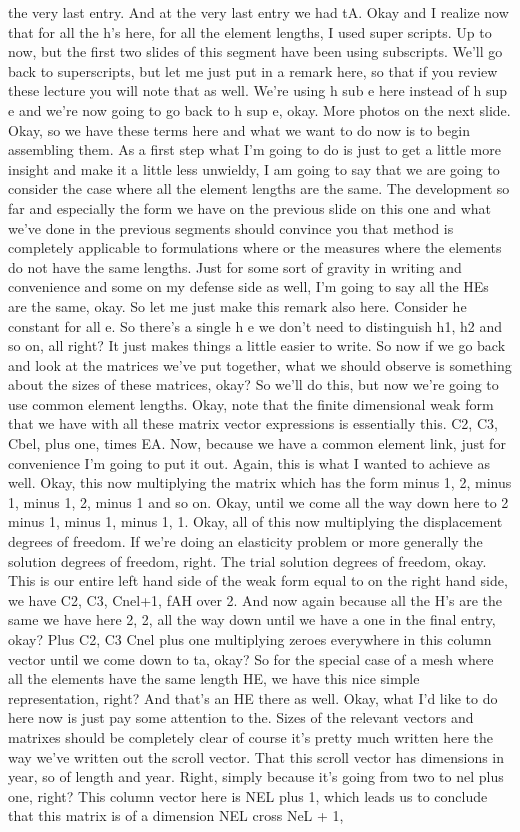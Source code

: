 \documentclass[10pt]{article}
\begin{document}
the very last entry. And at the very last entry we had tA. Okay and I realize now that for all the h's here, for all the element lengths, I used super scripts. Up to now, but the first two slides of this segment have been using subscripts. We'll go back to superscripts, but let me just put in a remark here, so that if you review these lecture you will note that as well. We're using h sub e here instead of h sup e and we're now going to go back to h sup e, okay. More photos on the next slide. Okay, so we have these terms here and what we want to do now is to begin assembling them. As a first step what I'm going to do is just to get a little more insight and make it a little less unwieldy, I am going to say that we are going to consider the case where all the element lengths are the same. The development so far and especially the form we have on the previous slide on this one and what we've done in the previous segments should convince you that method is completely applicable to formulations where or the measures where the elements do not have the same lengths. Just for some sort of gravity in writing and convenience and some on my defense side as well, I'm going to say all the HEs are the same, okay. So let me just make this remark also here. Consider he constant for all e. So there's a single h e we don't need to distinguish h1, h2 and so on, all right? It just makes things a little easier to write. So now if we go back and look at the matrices we've put together, what we should observe is something about the sizes of these matrices, okay? So we'll do this, but now we're going to use common element lengths. Okay, note that the finite dimensional weak form that we have with all these matrix vector expressions is essentially this. C2, C3, Cbel, plus one, times EA. Now, because we have a common element link, just for convenience I'm going to put it out. Again, this is what I wanted to achieve as well. Okay, this now multiplying the matrix which has the form minus 1, 2, minus 1, minus 1, 2, minus 1 and so on. Okay, until we come all the way down here to 2 minus 1, minus 1, minus 1, 1. Okay, all of this now multiplying the displacement degrees of freedom. If we're doing an elasticity problem or more generally the solution degrees of freedom, right. The trial solution degrees of freedom, okay. This is our entire left hand side of the weak form equal to on the right hand side, we have C2, C3, Cnel+1, fAH over 2. And now again because all the H's are the same we have here 2, 2, all the way down until we have a one in the final entry, okay? Plus C2, C3 Cnel plus one multiplying zeroes everywhere in this column vector until we come down to ta, okay? So for the special case of a mesh where all the elements have the same length HE, we have this nice simple representation, right? And that's an HE there as well. Okay, what I'd like to do here now is just pay some attention to the. Sizes of the relevant vectors and matrixes should be completely clear of course it's pretty much written here the way we've written out the scroll vector. That this scroll vector has dimensions in year, so of length and year. Right, simply because it's going from two to nel plus one, right? This column vector here is NEL plus 1, which leads us to conclude that this matrix is of a dimension NEL cross NeL + 1, 
\end{document}
